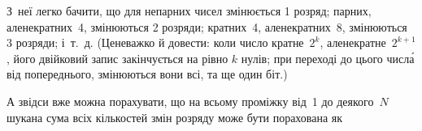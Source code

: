 
З~неї легко бачити, що для непарних чисел змінюється 1 розряд; парних, але\nolinebreak[2] не\nolinebreak[3] кратних~4, змінюються 2 розряди; кратних~4, але\nolinebreak[2] не\nolinebreak[3] кратних~8, змінюються 3 розряди; і~т.~д. (Це\nolinebreak[2] неважко й довести: коли число кратне~$2^{k}$, але\nolinebreak[2] не\nolinebreak[3] кратне~$2^{k+1}$, його двійковий запис закінчується на рівно $k$ нулів; при переході до цього числ\'{а} від попереднього, змінюються вони всі, та ще один біт.)

А звідси вже можна порахувати, що на всьому проміжку від~1 до деякого~$N$ шукана сума всіх кількостей змін розряду може бути порахована як 

\ifBigStretch
\vspace{-1.5\baselineskip}
\else
\vspace{-0.75\baselineskip}
\fi

